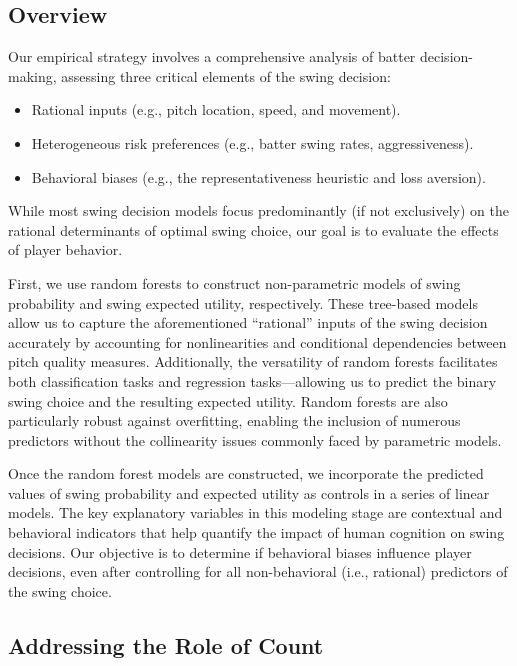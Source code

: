\documentclass[12pt]{article}
\numberwithin{equation}{section}
\begin{document}
\subsection{Overview}

Our empirical strategy involves a comprehensive analysis of batter decision-making, assessing three critical elements of the swing decision: 
\begin{itemize}
\item Rational inputs (e.g., pitch location, speed, and movement).
\item Heterogeneous risk preferences (e.g., batter swing rates, aggressiveness).
\item Behavioral biases (e.g., the representativeness heuristic and loss aversion).
\end{itemize}
While most swing decision models focus predominantly (if not exclusively) on the rational determinants of optimal swing choice, our goal is to evaluate the effects of player behavior.

\vspace{5mm} %

First, we use random forests to construct non-parametric models of swing probability and swing expected utility, respectively. These tree-based models allow us to capture the aforementioned “rational” inputs of the swing decision accurately by accounting for nonlinearities and conditional dependencies between pitch quality measures. Additionally, the versatility of random forests facilitates both classification tasks and regression tasks—allowing us to predict the binary swing choice and the resulting expected utility. Random forests are also particularly robust against overfitting, enabling the inclusion of numerous predictors without the collinearity issues commonly faced by parametric models.

\vspace{5mm} %

Once the random forest models are constructed, we incorporate the predicted values of swing probability and expected utility as controls in a series of linear models. The key explanatory variables in this modeling stage are contextual and behavioral indicators that help quantify the impact of human cognition on swing decisions. Our objective is to determine if behavioral biases influence player decisions, even after controlling for all non-behavioral (i.e., rational) predictors of the swing choice. 

\subsection{Addressing the Role of Count}
\end{document}
